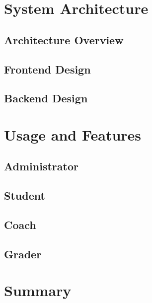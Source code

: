 \documentclass[12pt]{article}
\begin{document}
\section{System Architecture}
\subsection{Architecture Overview}
\subsection{Frontend Design}
\subsection{Backend Design}

\section{Usage and Features}
\subsection{Administrator}
\subsection{Student}
\subsection{Coach}
\subsection{Grader}

\section{Summary}
\end{document}
